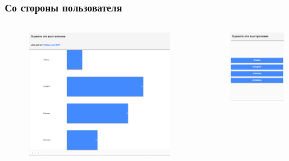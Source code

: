 \documentclass{beamer}
\begin{document}
\begin{frame}
\frametitle{Со стороны пользователя}
\begin{columns}[c]

\begin{figure}
	\includegraphics[width=\linewidth]{img/view.PNG}
\end{figure}


\begin{figure}
	\includegraphics[width=\linewidth]{img/slave.PNG}
\end{figure}



\end{columns}
\end{frame}
\end{document}
